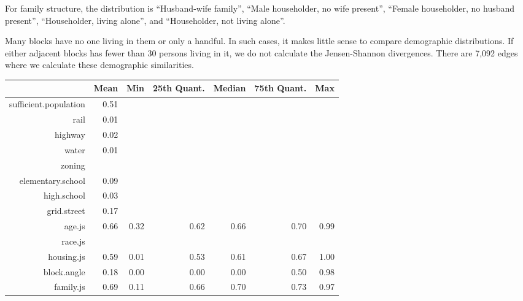 \documentclass[12pt,letter]{article}\usepackage[]{graphicx}\usepackage[]{color}
\makeatletter
\newenvironment{kframe}{%
 \def\at@end@of@kframe{}%
 \ifinner\ifhmode%
  \def\at@end@of@kframe{\end{minipage}}%
  \begin{minipage}{\columnwidth}%
 \fi\fi%
 \def\FrameCommand##1{\hskip\@totalleftmargin \hskip-\fboxsep
 \colorbox{shadecolor}{##1}\hskip-\fboxsep
     \hskip-\linewidth \hskip-\@totalleftmargin \hskip\columnwidth}%
 \MakeFramed {\advance\hsize-\width
   \@totalleftmargin\z@ \linewidth\hsize
   \@setminipage}}%
 {\par\unskip\endMakeFramed%
 \at@end@of@kframe}
\makeatother
\begin{document}
For family structure, the distribution is ``Husband-wife family'', ``Male
householder, no wife present'', ``Female householder, no husband present'',
``Householder, living alone'', and ``Householder, not living alone''.

Many blocks have no one living in them or only a handful. In such
cases, it makes little sense to compare demographic distributions. If
either adjacent blocks has fewer than 30 persons living in it, we do
not calculate the Jensen-Shannon divergences. There are
7,092 edges where we calculate these
demographic similarities.


\begin{kframe}


{\ttfamily\noindent\color{warningcolor}{\#\# Warning: argument is not numeric or logical: returning NA\\\#\# Warning: argument is not numeric or logical: returning NA\\\#\# Warning: is.na() applied to non-(list or vector) of type 'NULL'}}\end{kframe}%
\begin{table}[ht]
\centering
\begin{tabular}{rrrrrrr}
  \hline
 & Mean & Min & 25th Quant. & Median & 75th Quant. & Max \\ 
  \hline
sufficient.population & 0.51 &  &  &  &  &  \\ 
  rail & 0.01 &  &  &  &  &  \\ 
  highway & 0.02 &  &  &  &  &  \\ 
  water & 0.01 &  &  &  &  &  \\ 
  zoning &  &  &  &  &  &  \\ 
  elementary.school & 0.09 &  &  &  &  &  \\ 
  high.school & 0.03 &  &  &  &  &  \\ 
  grid.street & 0.17 &  &  &  &  &  \\ 
  age.js & 0.66 & 0.32 & 0.62 & 0.66 & 0.70 & 0.99 \\ 
  race.js &  &  &  &  &  &  \\ 
  housing.js & 0.59 & 0.01 & 0.53 & 0.61 & 0.67 & 1.00 \\ 
  block.angle & 0.18 & 0.00 & 0.00 & 0.00 & 0.50 & 0.98 \\ 
  family.js & 0.69 & 0.11 & 0.66 & 0.70 & 0.73 & 0.97 \\ 
   \hline
\end{tabular}
\end{table}
\end{document}
